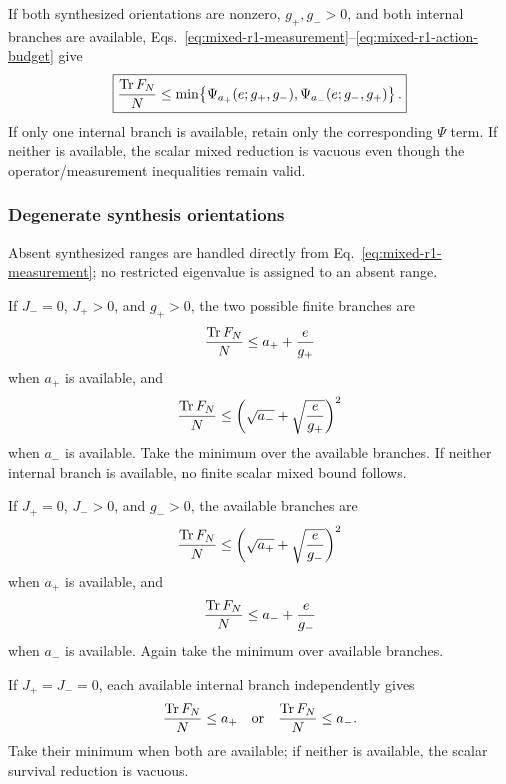 If both synthesized orientations are nonzero, $g_+,g_->0$, and both internal branches are available, Eqs.~\eqref{eq:mixed-r1-measurement}--\eqref{eq:mixed-r1-action-budget} give
\begin{equation}
\boxed{
\frac{\operatorname{Tr} F_N}{N}
\le
\min\!\left\{
\Psi_{a_+}(e;g_+,g_-),
\Psi_{a_-}(e;g_-,g_+)
\right\}.
}
\label{eq:mixed-r1-bilateral}
\end{equation}
If only one internal branch is available, retain only the corresponding $\Psi$ term. If neither is available, the scalar mixed reduction is vacuous even though the operator/measurement inequalities remain valid.

\subsubsection{Degenerate synthesis orientations}

Absent synthesized ranges are handled directly from Eq.~\eqref{eq:mixed-r1-measurement}; no restricted eigenvalue is assigned to an absent range.

If $J_-=0$, $J_+>0$, and $g_+>0$, the two possible finite branches are
\begin{equation}
\frac{\operatorname{Tr} F_N}{N}\le a_+ +\frac{e}{g_+}
\label{eq:mixed-r1-plus-only-upper}
\end{equation}
when $a_+$ is available, and
\begin{equation}
\frac{\operatorname{Tr} F_N}{N}
\le
\left(\sqrt{a_-}+\sqrt{\frac{e}{g_+}}\right)^2
\label{eq:mixed-r1-plus-only-lower}
\end{equation}
when $a_-$ is available. Take the minimum over the available branches. If neither internal branch is available, no finite scalar mixed bound follows.

If $J_+=0$, $J_->0$, and $g_->0$, the available branches are
\begin{equation}
\frac{\operatorname{Tr} F_N}{N}
\le
\left(\sqrt{a_+}+\sqrt{\frac{e}{g_-}}\right)^2
\label{eq:mixed-r1-minus-only-upper}
\end{equation}
when $a_+$ is available, and
\begin{equation}
\frac{\operatorname{Tr} F_N}{N}\le a_- +\frac{e}{g_-}
\label{eq:mixed-r1-minus-only-lower}
\end{equation}
when $a_-$ is available. Again take the minimum over available branches.

If $J_+=J_-=0$, each available internal branch independently gives
\begin{equation}
\frac{\operatorname{Tr} F_N}{N}\le a_+
\quad\text{or}\quad
\frac{\operatorname{Tr} F_N}{N}\le a_-.
\end{equation}
Take their minimum when both are available; if neither is available, the scalar survival reduction is vacuous.

